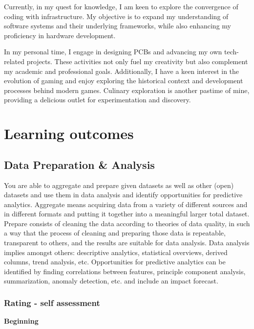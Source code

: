 \documentclass[a4paper, 11pt]{article}
\begin{document}
Currently, in my quest for knowledge, I am keen to explore the convergence of coding with infrastructure. My objective is to expand my understanding of software systems and their underlying frameworks, while also enhancing my proficiency in hardware development.
\medbreak

In my personal time, I engage in designing PCBs and advancing my own tech-related projects. These activities not only fuel my creativity but also complement my academic and professional goals. Additionally, I have a keen interest in the evolution of gaming and enjoy exploring the historical context and development processes behind modern games. Culinary exploration is another pastime of mine, providing a delicious outlet for experimentation and discovery.
\pagebreak
\section{Learning outcomes}

\subsection{Data Preparation \& Analysis}
You are able to aggregate and prepare given datasets as well as other (open) datasets and use them in data analysis and identify opportunities for predictive analytics.   
\medbreak
Aggregate means acquiring data from a variety of different sources and in different formats and putting it together into a meaningful larger total dataset. Prepare consists of cleaning the data according to theories of data quality, in such a way that the process of cleaning and preparing those data is repeatable, transparent to others, and the results are suitable for data analysis. Data analysis implies amongst others: descriptive analytics, statistical overviews, derived columns, trend analysis, etc. Opportunities for predictive analytics can be identified by finding correlations between features, principle component analysis, summarization, anomaly detection, etc. and include an impact forecast.  

\subsubsection{Rating - self assessment}
\textbf{Beginning} 
\end{document}
